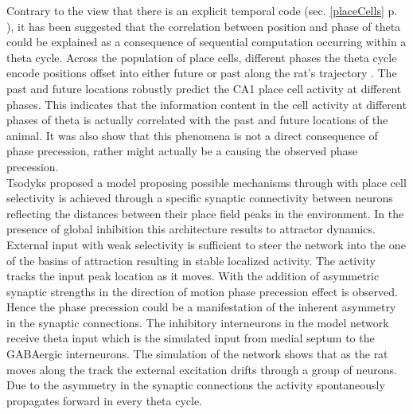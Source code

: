 Contrary to the view that there is an explicit temporal code (sec. \ref{placeCells} p. \pageref{placeCells}), it has been suggested that the correlation between position and phase of theta could be explained as a consequence of sequential computation occurring within a theta cycle. Across the population of place cells, different phases the theta cycle encode positions offset into either future or past along the rat's trajectory \cite{Itskov2008}. The past and future locations  robustly predict the CA1 place cell activity at different phases. This indicates that the information content in the cell activity at different phases of theta is actually correlated with the past and future locations of the animal. It was also show that this phenomena is not a direct consequence of phase precession, rather might actually be a causing the observed phase precession. \\

Tsodyks \cite{Tsodyks1996} proposed a model proposing possible mechanisms through with place cell selectivity is achieved through a specific synaptic connectivity between neurons reflecting the distances between their place field peaks in the environment. In the presence of global inhibition this architecture results to attractor dynamics. External input with weak selectivity is sufficient to steer the network into the one of the basins of attraction resulting in stable localized activity. The activity tracks the input peak location as it moves. With the addition of asymmetric synaptic strengths in the direction of motion phase precession effect is observed. Hence the phase precession could be a manifestation of the inherent asymmetry in the synaptic connections. The inhibitory interneurons in the model network receive theta input which is the simulated input from medial septum to the GABAergic interneurons. The simulation of the network shows that as the rat moves along the track the external excitation drifts through a group of neurons. Due to the asymmetry in the synaptic connections the activity spontaneously propagates forward in every theta cycle. \\  

